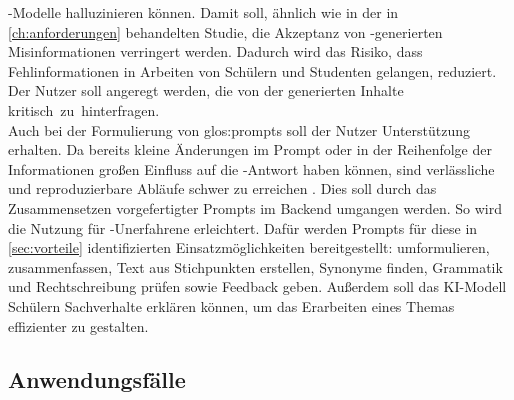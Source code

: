 \documentclass[../main.tex]{subfiles}
\begin{document}
-Modelle halluzinieren können. Damit soll, ähnlich wie in der in \autoref{ch:anforderungen} behandelten Studie, die Akzeptanz von -generierten Misinformationen verringert werden. Dadurch 
wird das Risiko, dass Fehlinformationen in Arbeiten von Schülern und Studenten gelangen, reduziert. Der Nutzer soll angeregt werden, die von der  generierten Inhalte 
\mbox{kritisch zu hinterfragen.}\\
Auch bei der Formulierung von \gls{glos:prompt}s soll der Nutzer Unterstützung erhalten. Da bereits kleine Änderungen im Prompt oder in der Reihenfolge der Informationen großen 
Einfluss auf die -Antwort haben können, sind verlässliche und reproduzierbare Abläufe schwer zu erreichen \cite{creativeWriting}. Dies soll durch das Zusammensetzen vorgefertigter 
Prompts im Backend umgangen werden. So wird die Nutzung für -Unerfahrene erleichtert. Dafür werden Prompts für diese in \autoref{sec:vorteile} identifizierten 
Einsatzmöglichkeiten bereitgestellt: umformulieren, zusammenfassen, Text aus Stichpunkten erstellen, Synonyme finden, Grammatik und Rechtschreibung prüfen sowie Feedback geben. Außerdem soll das KI-Modell
Schülern Sachverhalte erklären können, um das Erarbeiten eines Themas effizienter zu gestalten.


\subsection{Anwendungsfälle}
\end{document}
